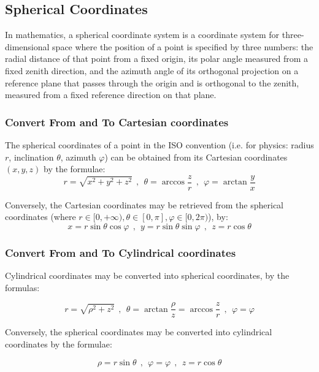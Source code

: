 \subsection{Spherical Coordinates}
In mathematics, a spherical coordinate system is a coordinate system for three-dimensional space where the position of a point is specified by three numbers: the radial distance of that point from a fixed origin, its polar angle measured from a fixed zenith direction, and the azimuth angle of its orthogonal projection on a reference plane that passes through the origin and is orthogonal to the zenith, measured from a fixed reference direction on that plane.

\subsubsection{Convert From and To Cartesian coordinates}
The spherical coordinates of a point in the ISO convention (i.e. for physics: radius $r$, inclination $\theta$, azimuth $\varphi$) can be obtained from its Cartesian coordinates $(x, y, z)$ by the formulae:
\[
r=\sqrt{x^2+y^2+z^2} ~~,~~ \theta=\arccos\frac{z}{r} ~~,~~ \varphi = \arctan\frac{y}{x}
\]

Conversely, the Cartesian coordinates may be retrieved from the spherical coordinates (where $r \in [0, +\infty), \theta \in [0, \pi], \varphi \in [0, 2\pi)$), by:
\[
x=r\sin\theta\cos\varphi ~~,~~ y=r\sin\theta\sin\varphi ~~,~~ z=r\cos\theta
\]

\subsubsection{Convert From and To Cylindrical coordinates}
Cylindrical coordinates may be converted into spherical coordinates, by the formulas:

\[
r=\sqrt{\rho^2 + z^2} ~~,~~ \theta=\arctan\frac{\rho}{z}=\arccos\frac{z}{r}   ~~,~~ \varphi = \varphi
\]

Conversely, the spherical coordinates may be converted into cylindrical coordinates by the formulae:

\[
\rho = r\sin\theta   ~~,~~  \varphi=\varphi  ~~,~~ z = r\cos\theta
\]